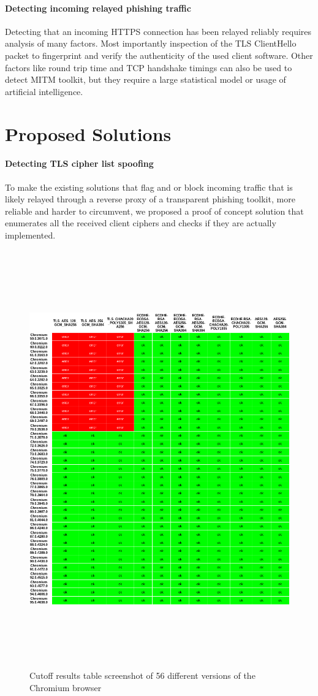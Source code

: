 \documentclass[12pt]{scrbook}
\begin{document}
\paragraph{Detecting incoming relayed phishing traffic}
Detecting that an incoming HTTPS connection has been relayed reliably requires
analysis of many factors. Most importantly inspection of the TLS ClientHello packet
to fingerprint and verify the authenticity of the used client software.
Other factors like round trip time and TCP handshake timings can also be used to
detect MITM toolkit, but they require a large statistical model or usage of artificial intelligence.

\section{Proposed Solutions}
\paragraph{Detecting TLS cipher list spoofing}
To make the existing solutions that flag and or block incoming traffic that is likely
relayed through a reverse proxy of a transparent phishing toolkit, more reliable and harder
to circumvent, we proposed a proof of concept solution that enumerates all the received
client ciphers and checks if they are actually implemented.

\begin{figure}[!h]
    \centering
    \includegraphics[height=18cm]{./images/cipher_checker_table.png}
    \caption{Cutoff results table screenshot of 56 different versions of the
        Chromium browser}
\end{figure}
\end{document}
